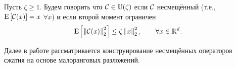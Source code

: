 \documentclass{article}
\begin{document}
\begin{definition}
Пусть $\zeta \geq 1$. Будем говорить что ${\cal C}\in \mathbb{U}(\zeta)$ если ${\cal C}$ несмещённый (т.е., ${{\rm E}}\left[{\cal C}(x)\right]=x$  $\forall x$) и если второй момент ограничен 
\begin{equation}
 {{\rm E}}\left[ \left\| {\cal C}(x) \right\|_2^2 \right] \leq \zeta  \left\| x \right\|_2^2, \qquad \forall x\in\mathbb{R}^d \,.
\end{equation} 

\end{definition}

Далее в работе рассматривается конструирование несмещённых операторов сжатия на основе малоранговых разложений. 




\end{document}
